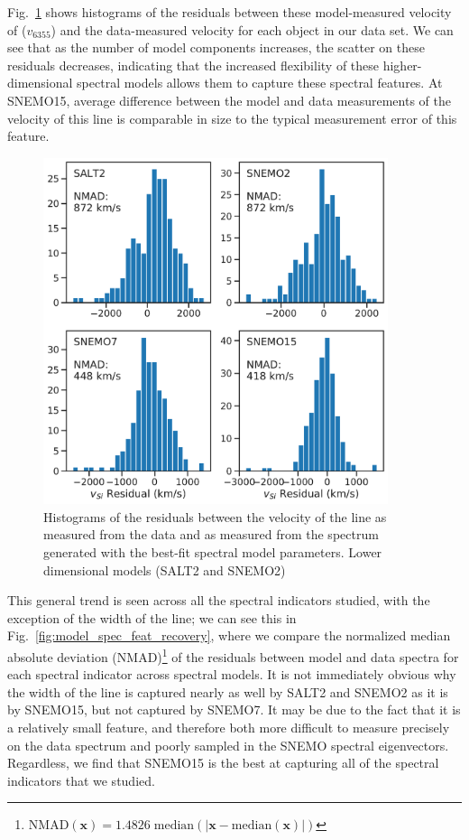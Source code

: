 Fig.~\ref{fig:model_vSi_recovery} shows histograms of the residuals between these model-measured velocity of \SiIIred{} ($v_{6355}$) and the data-measured velocity for each object in our data set. We can see that as the number of model components increases, the scatter on these residuals decreases, indicating that the increased flexibility of these higher-dimensional spectral models allows them to capture these spectral features. At SNEMO15, average difference between the model and data measurements of the velocity of this line is comparable in size to the typical measurement error of this feature.

\begin{figure}
    \centering
    \includegraphics[width=0.9\textwidth]{figures/snemo_kde/model_vSi_recovery.pdf}
    \caption{Histograms of the residuals between the velocity of the \SiIIred line as measured from the data and as measured from the spectrum generated with the best-fit spectral model parameters. Lower dimensional models (SALT2 and SNEMO2) }
    \label{fig:model_vSi_recovery}
\end{figure}

This general trend is seen across all the spectral indicators studied, with the exception of the width of the \SiIIblue line; we can see this in Fig.~\ref{fig:model_spec_feat_recovery}, where we compare the normalized median absolute deviation (NMAD)\footnote{$\text{NMAD}(\bm{x})=1.4826\;\text{median}(|\bm{x}-\text{median}(\bm{x})|)$} of the residuals between model and data spectra for each spectral indicator across spectral models. It is not immediately obvious why the width of the \SiIIblue line is captured nearly as well by SALT2 and SNEMO2 as it is by SNEMO15, but not captured by SNEMO7. It may be due to the fact that it is a relatively small feature, and therefore both more difficult to measure precisely on the data spectrum and poorly sampled in the SNEMO spectral eigenvectors. Regardless, we find that SNEMO15 is the best at capturing all of the spectral indicators that we studied.

